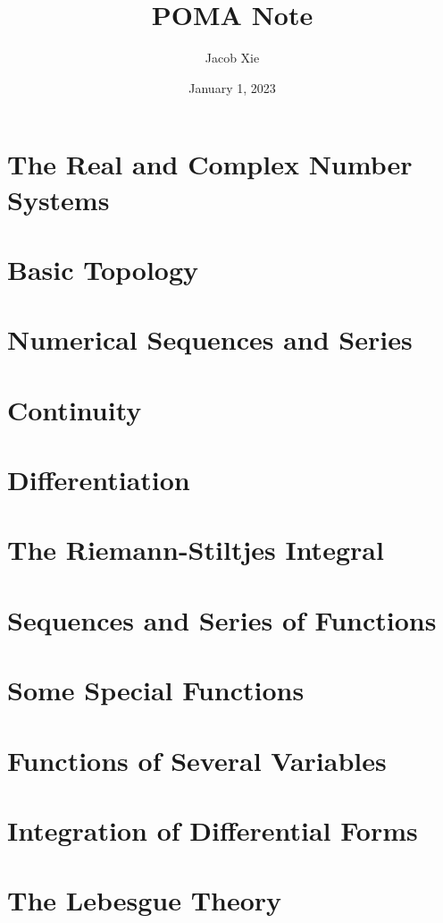 \documentclass[UTF8]{ctexart}
\title{POMA Note}
\author{Jacob Xie}
\date{January 1, 2023}
\theoremstyle{remark}
\theoremstyle{definition}
\begin{document}
\maketitle
\newpage

\section{The Real and Complex Number Systems}

\newpage

\section{Basic Topology}
% 
\newpage

\section{Numerical Sequences and Series}
% 
\newpage

\section{Continuity}
% 
\newpage

\section{Differentiation}
% 
\newpage

\section{The Riemann-Stiltjes Integral}
% 
\newpage

\section{Sequences and Series of Functions}
% 
\newpage

\section{Some Special Functions}
% 
\newpage

\section{Functions of Several Variables}
% 
\newpage

\section{Integration of Differential Forms}
% 
\newpage

\section{The Lebesgue Theory}
% 
\newpage
\end{document}
